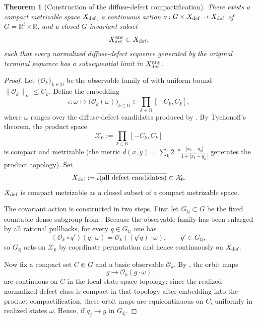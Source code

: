 \documentclass[11pt]{amsart}
\numberwithin{equation}{section}
\theoremstyle{plain}
\newtheorem{theorem}{Theorem}[section]
\theoremstyle{definition}
\theoremstyle{remark}
\begin{document}
\begin{theorem}[Construction of the diffuse-defect compactification]
\label{thm:diffuse-defect-compactification-construction}
There exists a compact metrizable space \(X_{\rm def}\), a continuous action
\(\sigma\colon G\times X_{\rm def}\to X_{\rm def}\) of
\(G=\mathbb R^3\rtimes\mathbb R\), and a closed \(G\)-invariant subset
\[
   X_{\rm def}^{\rm anc}\subset X_{\rm def} ,
\]
such that every normalized diffuse-defect sequence generated by the original
terminal sequence has a subsequential limit in \(X_{\rm def}^{\rm anc}\).
\end{theorem}

\begin{proof}
Let \(\{\mathcal O_k\}_{k\in\mathbb N}\) be the observable family of
 with uniform bound
\(\|\mathcal O_k\|_\infty\le C_k\).  Define the embedding
\[
   \iota\colon \omega\longmapsto
   \bigl(\mathcal O_k(\omega)\bigr)_{k\in\mathbb N}
   \in
   \prod_{k\in\mathbb N}[-C_k,C_k] ,
\]
where \(\omega\) ranges over the diffuse-defect candidates produced by
.  By Tychonoff's theorem, the product
space
\[
   \mathcal X_0:=\prod_{k\in\mathbb N}[-C_k,C_k]
\]
is compact and metrizable (the metric
\(d(x,y)=\sum_k 2^{-k}\frac{|x_k-y_k|}{1+|x_k-y_k|}\) generates the product
topology).  Set
\[
   X_{\rm def}:=\overline{\iota(\text{all defect candidates})}
   \subset \mathcal X_0 .
\]
\(X_{\rm def}\) is compact metrizable as a closed subset of a compact
metrizable space.

The covariant action is constructed in two steps.  First let
\(G_{\mathbb Q}\subset G\) be the fixed countable dense subgroup from
.  Because the observable family has been
enlarged by all rational pullbacks, for every \(q\in G_{\mathbb Q}\) one has
\[
   (\mathcal O_k\circ q')(q\cdot\omega)=\mathcal O_k((q'q)\cdot\omega),
   \qquad q'\in G_{\mathbb Q},
\]
so \(G_{\mathbb Q}\) acts on \(\mathcal X_0\) by coordinate permutation and
hence continuously on \(X_{\rm def}\).

Now fix a compact set \(C\Subset G\) and a basic observable \(\mathcal O_k\).
By ,
the orbit maps
\[
   g\longmapsto \mathcal O_k(g\cdot\omega)
\]
are continuous on \(C\) in the local state-space topology; since the realized
normalized defect class is compact in that topology after embedding into the
product compactification, these orbit maps are equicontinuous on \(C\),
uniformly in realized states \(\omega\).  Hence, if \(q_j\to g\) in
\(G_{\mathbb Q}\).


\end{proof}
\end{document}
